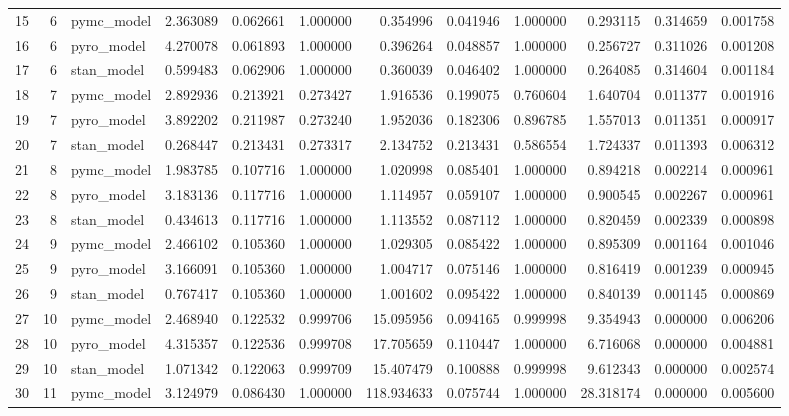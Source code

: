 \begin{tabular}{lrlrrrrrrrrr}
15 & 6 & pymc_model & 2.363089 & 0.062661 & 1.000000 & 0.354996 & 0.041946 & 1.000000 & 0.293115 & 0.314659 & 0.001758 \\
16 & 6 & pyro_model & 4.270078 & 0.061893 & 1.000000 & 0.396264 & 0.048857 & 1.000000 & 0.256727 & 0.311026 & 0.001208 \\
17 & 6 & stan_model & 0.599483 & 0.062906 & 1.000000 & 0.360039 & 0.046402 & 1.000000 & 0.264085 & 0.314604 & 0.001184 \\
18 & 7 & pymc_model & 2.892936 & 0.213921 & 0.273427 & 1.916536 & 0.199075 & 0.760604 & 1.640704 & 0.011377 & 0.001916 \\
19 & 7 & pyro_model & 3.892202 & 0.211987 & 0.273240 & 1.952036 & 0.182306 & 0.896785 & 1.557013 & 0.011351 & 0.000917 \\
20 & 7 & stan_model & 0.268447 & 0.213431 & 0.273317 & 2.134752 & 0.213431 & 0.586554 & 1.724337 & 0.011393 & 0.006312 \\
21 & 8 & pymc_model & 1.983785 & 0.107716 & 1.000000 & 1.020998 & 0.085401 & 1.000000 & 0.894218 & 0.002214 & 0.000961 \\
22 & 8 & pyro_model & 3.183136 & 0.117716 & 1.000000 & 1.114957 & 0.059107 & 1.000000 & 0.900545 & 0.002267 & 0.000961 \\
23 & 8 & stan_model & 0.434613 & 0.117716 & 1.000000 & 1.113552 & 0.087112 & 1.000000 & 0.820459 & 0.002339 & 0.000898 \\
24 & 9 & pymc_model & 2.466102 & 0.105360 & 1.000000 & 1.029305 & 0.085422 & 1.000000 & 0.895309 & 0.001164 & 0.001046 \\
25 & 9 & pyro_model & 3.166091 & 0.105360 & 1.000000 & 1.004717 & 0.075146 & 1.000000 & 0.816419 & 0.001239 & 0.000945 \\
26 & 9 & stan_model & 0.767417 & 0.105360 & 1.000000 & 1.001602 & 0.095422 & 1.000000 & 0.840139 & 0.001145 & 0.000869 \\
27 & 10 & pymc_model & 2.468940 & 0.122532 & 0.999706 & 15.095956 & 0.094165 & 0.999998 & 9.354943 & 0.000000 & 0.006206 \\
28 & 10 & pyro_model & 4.315357 & 0.122536 & 0.999708 & 17.705659 & 0.110447 & 1.000000 & 6.716068 & 0.000000 & 0.004881 \\
29 & 10 & stan_model & 1.071342 & 0.122063 & 0.999709 & 15.407479 & 0.100888 & 0.999998 & 9.612343 & 0.000000 & 0.002574 \\
30 & 11 & pymc_model & 3.124979 & 0.086430 & 1.000000 & 118.934633 & 0.075744 & 1.000000 & 28.318174 & 0.000000 & 0.005600 \\

\end{tabular}
